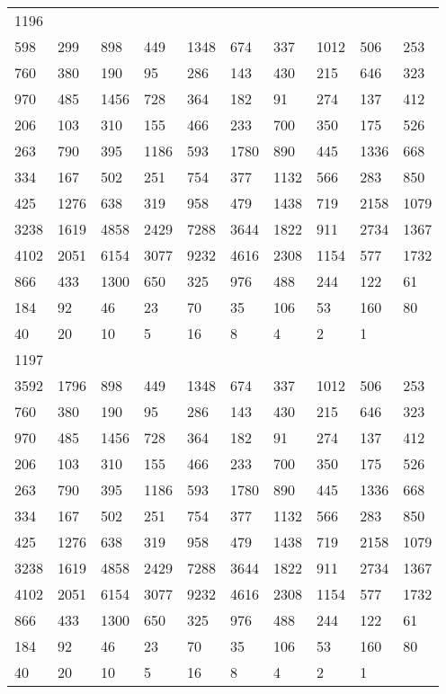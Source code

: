 \begin{longtable}{*{10}{l}}
1196&&&&&&&&&\\
598& 299& 898& 449& 1348& 674& 337& 1012& 506& 253\\
760& 380& 190& 95& 286& 143& 430& 215& 646& 323\\
970& 485& 1456& 728& 364& 182& 91& 274& 137& 412\\
206& 103& 310& 155& 466& 233& 700& 350& 175& 526\\
263& 790& 395& 1186& 593& 1780& 890& 445& 1336& 668\\
334& 167& 502& 251& 754& 377& 1132& 566& 283& 850\\
425& 1276& 638& 319& 958& 479& 1438& 719& 2158& 1079\\
3238& 1619& 4858& 2429& 7288& 3644& 1822& 911& 2734& 1367\\
4102& 2051& 6154& 3077& 9232& 4616& 2308& 1154& 577& 1732\\
866& 433& 1300& 650& 325& 976& 488& 244& 122& 61\\
184& 92& 46& 23& 70& 35& 106& 53& 160& 80\\
40& 20& 10& 5& 16& 8& 4& 2& 1& \\

1197&&&&&&&&&\\
3592& 1796& 898& 449& 1348& 674& 337& 1012& 506& 253\\
760& 380& 190& 95& 286& 143& 430& 215& 646& 323\\
970& 485& 1456& 728& 364& 182& 91& 274& 137& 412\\
206& 103& 310& 155& 466& 233& 700& 350& 175& 526\\
263& 790& 395& 1186& 593& 1780& 890& 445& 1336& 668\\
334& 167& 502& 251& 754& 377& 1132& 566& 283& 850\\
425& 1276& 638& 319& 958& 479& 1438& 719& 2158& 1079\\
3238& 1619& 4858& 2429& 7288& 3644& 1822& 911& 2734& 1367\\
4102& 2051& 6154& 3077& 9232& 4616& 2308& 1154& 577& 1732\\
866& 433& 1300& 650& 325& 976& 488& 244& 122& 61\\
184& 92& 46& 23& 70& 35& 106& 53& 160& 80\\
40& 20& 10& 5& 16& 8& 4& 2& 1& \\


\end{longtable}
